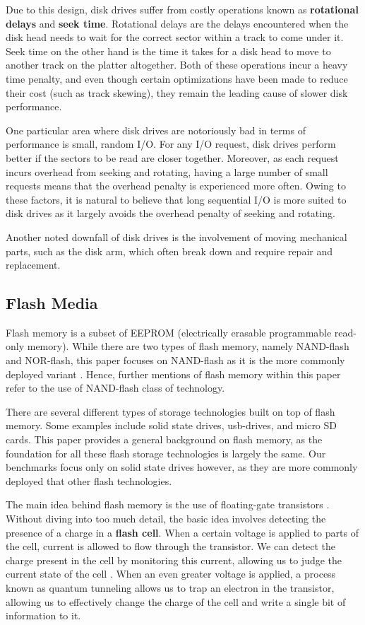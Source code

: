 \documentclass[10pt, author, twocolumn]{article}
\begin{document}
Due to this design, disk drives suffer from costly operations known as \textbf{rotational delays} and \textbf{seek time}. Rotational delays are the delays encountered when the disk head needs to wait for the correct sector within a track to come under it. Seek time on the other hand is the time it takes for a disk head to move to another track on the platter altogether. Both of these operations incur a heavy time penalty, and even though certain optimizations have been made to reduce their cost (such as track skewing), they remain the leading cause of slower disk performance. 

One particular area where disk drives are notoriously bad in terms of performance is small, random I/O. For any I/O request, disk drives perform better if the sectors to be read are closer together. Moreover, as each request incurs overhead from seeking and rotating, having a large number of small requests means that the overhead penalty is experienced more often. Owing to these factors, it is natural to believe that long sequential I/O is more suited to disk drives as it largely avoids the overhead penalty of seeking and rotating. 

Another noted downfall of disk drives is the involvement of moving mechanical parts, such as the disk arm, which often break down and require repair and replacement.

\subsection{Flash Media}

Flash memory is a subset of EEPROM (electrically erasable programmable read-only memory). While there are two types of flash memory, namely NAND-flash and NOR-flash, this paper focuses on NAND-flash as it is the more commonly deployed variant \cite{}. Hence, further mentions of flash memory within this paper refer to the use of NAND-flash class of technology. 

There are several different types of storage technologies built on top of flash memory. Some examples include solid state drives, usb-drives, and micro SD cards. This paper provides a general background on flash memory, as the foundation for all these flash storage technologies is largely the same. Our benchmarks focus only on solid state drives however, as they are more commonly deployed that other flash technologies.

The main idea behind flash memory is the use of floating-gate transistors \cite{}. Without diving into too much detail, the basic idea involves detecting the presence of a charge in a \textbf{flash cell}. When a certain voltage is applied to parts of the cell, current is allowed to flow through the transistor. We can detect the charge present in the cell by monitoring this current, allowing us to judge the current state of the cell \cite{}. When an even greater voltage is applied, a process known as quantum tunneling allows us to trap an electron in the transistor, allowing us to effectively change the charge of the cell and write a single bit of information to it.
\end{document}
